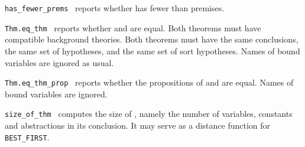 \begin{isabellebody}
\begin{isamarkuptext}
  \begin{description}

  \item \verb|has_fewer_prems|~ reports whether  has fewer than  premises.

  \item \verb|Thm.eq_thm|~ reports whether  and  are equal.  Both theorems must have
  compatible background theories.  Both theorems must have the same
  conclusions, the same set of hypotheses, and the same set of sort
  hypotheses.  Names of bound variables are ignored as usual.

  \item \verb|Thm.eq_thm_prop|~ reports whether
  the propositions of  and  are equal.
  Names of bound variables are ignored.

  \item \verb|size_of_thm|~ computes the size of , namely the number of variables, constants and abstractions
  in its conclusion.  It may serve as a distance function for
  \verb|BEST_FIRST|.

  \end{description}%
\end{isamarkuptext}%
\isamarkuptrue%
%
\isadelimtheory
%
\endisadelimtheory
%
\isatagtheory
{}\isamarkupfalse%
%
\endisatagtheory
{\isafoldtheory}%
%
\isadelimtheory
%
\endisadelimtheory
\isanewline
\end{isabellebody}%
